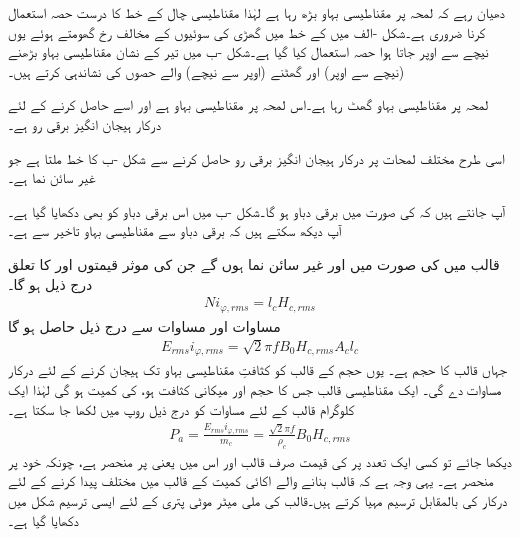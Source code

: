 دھیان رہے کہ لمحہ  پر مقناطیسی بہاو بڑھ رہا ہے لہٰذا مقناطیسی چال کے خط کا درست حصہ استعمال کرنا ضروری ہے۔شکل -الف میں    کے خط میں گھڑی کی سوئیوں کے مخالف رخ گھومتے ہوئے یوں نیچے سے اوپر جاتا ہوا حصہ استعمال کیا گیا ہے۔شکل -ب میں  تیر کے نشان  مقناطیسی بہاو بڑھنے (نیچے سے اوپر) اور گھٹنے (اوپر سے نیچے) والے حصوں کی نشاندہی کرتے ہیں۔


 لمحہ  پر مقناطیسی بہاو گھٹ رہا ہے۔اس لمحہ پر مقناطیسی بہاو  ہے اور اسے حاصل کرنے کے لئے درکار ہیجان انگیز برقی رو  ہے۔

اسی طرح مختلف لمحات پر درکار ہیجان انگیز برقی رو حاصل کرنے سے شکل -ب کا      خط ملتا ہے جو  غیر سائن نما ہے۔

آپ جانتے ہیں کہ   کی صورت میں برقی دباو  ہو گا۔شکل -ب میں اس برقی دباو کو بھی دکھایا گیا ہے۔آپ دیکھ سکتے ہیں کہ برقی دباو سے  مقناطیسی بہاو  تاخیر سے ہے۔

قالب میں   کی صورت میں   اور   غیر سائن نما ہوں گے جن  کی موثر قیمتوں  اور   کا تعلق درج ذیل ہو گا۔
\begin{align}\label{مساوات_مقناطیسی_دور_دباو_برابر_شدت_ضرب_لمبائی}
N i_{\varphi,rms}=l_c H_{c,rms}
\end{align}
مساوات    اور مساوات   سے درج ذیل حاصل ہو گا
\begin{align}\label{مساوات_مقناطیسی_دور_درکار_دباو_ضرب_رو}
E_{rms} i_{\varphi,rms}=\sqrt{2} \pi f B_0 H_{c,rms} A_c l_c
\end{align}
جہاں   قالب کا حجم ہے۔ یوں    حجم کے قالب  کو  کثافتِ مقناطیسی بہاو تک ہیجان کرنے کے لئے درکار  مساوات   دے گی۔ ایک مقناطیسی قالب جس کا حجم   اور  میکانی کثافت   ہو، کی کمیت  ہو گی لہٰذا  ایک کلوگرام  قالب کے لئے مساوات  کو  درج ذیل روپ میں لکھا جا سکتا ہے۔
\begin{align}
P_a=\frac{E_{rms} i_{\varphi,rms}}{m_c}=\frac{\sqrt{2} \pi f}{\rho_c} B_0 H_{c,rms}
\end{align}
دیکھا جائے تو کسی ایک تعدد   پر  کی قیمت صرف قالب اور اس میں  یعنی  پر منحصر ہے، چونکہ  خود  پر منحصر ہے۔ یہی وجہ ہے کہ  قالب بنانے والے اکائی کمیت کے قالب میں مختلف  پیدا کرنے کے لئے درکار  کی  بالمقابل  ترسیم مہیا کرتے ہیں۔قالب کی  ملی میٹر موٹی پتری کے لئے ایسی ترسیم  شکل  میں دکھایا گیا ہے۔
